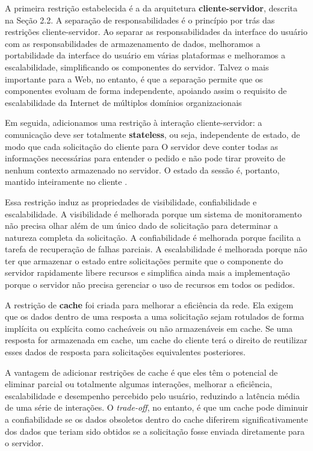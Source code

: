 A primeira restrição estabelecida é a da arquitetura \textbf{cliente-servidor}, descrita na Seção 2.2. A separação de responsabilidades é o princípio por trás das restrições cliente-servidor. Ao separar as responsabilidades da interface do usuário com as responsabilidades de armazenamento de dados, melhoramos a portabilidade da interface do usuário em várias plataformas e melhoramos a escalabilidade, simplificando os componentes do servidor. Talvez o mais importante para a Web, no entanto, é que a separação permite que os componentes evoluam de forma independente, apoiando assim o requisito de escalabilidade da Internet de múltiplos domínios organizacionais \cite{rest-thesis}

Em seguida, adicionamos uma restrição à interação cliente-servidor: a comunicação deve ser totalmente \textbf{stateless}, ou seja, independente de estado, de modo que cada solicitação do cliente para O servidor deve conter todas as informações necessárias para entender o pedido e não pode tirar proveito de nenhum contexto armazenado no servidor. O estado da sessão é, portanto, mantido inteiramente no cliente \cite{rest-thesis}.

Essa restrição induz as propriedades de visibilidade, confiabilidade e escalabilidade. A visibilidade é melhorada porque um sistema de monitoramento não precisa olhar além de um único dado de solicitação para determinar a natureza completa da solicitação. A confiabilidade é melhorada porque facilita a tarefa de recuperação de falhas parciais. A escalabilidade é melhorada porque não ter que armazenar o estado entre solicitações permite que o componente do servidor rapidamente libere recursos e simplifica ainda mais a implementação porque o servidor não precisa gerenciar o uso de recursos em todos os pedidos.

A restrição de \textbf{cache} foi criada para melhorar a eficiência da rede. Ela exigem que os dados dentro de uma resposta a uma solicitação sejam rotulados de forma implícita ou explícita como cacheáveis ou não armazenáveis em cache. Se uma resposta for armazenada em cache, um cache do cliente terá o direito de reutilizar esses dados de resposta para solicitações equivalentes posteriores.

A vantagem de adicionar restrições de cache é que eles têm o potencial de eliminar parcial ou totalmente algumas interações, melhorar a eficiência, escalabilidade e desempenho percebido pelo usuário, reduzindo a latência média de uma série de interações. O \textit{trade-off}, no entanto, é que um cache pode diminuir a confiabilidade se os dados obsoletos dentro do cache diferirem significativamente dos dados que teriam sido obtidos se a solicitação fosse enviada diretamente para o servidor.

